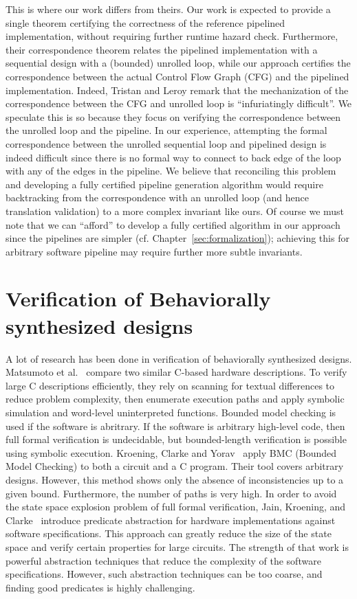 This is where our work differs from theirs.  Our work is
expected to provide a single theorem certifying the
correctness of the reference pipelined implementation,
without requiring further runtime hazard check.
Furthermore, their correspondence theorem relates the
pipelined implementation with a sequential design with a
(bounded) unrolled loop, while our approach certifies the
correspondence between the actual Control Flow Graph (CFG)
and the pipelined implementation.  Indeed, Tristan and Leroy
remark that the mechanization of the correspondence between
the CFG and unrolled loop is ``infuriatingly difficult''.
We speculate this is so because they focus on verifying the
correspondence between the unrolled loop and the pipeline.
In our experience, attempting the formal correspondence between the unrolled
sequential loop and pipelined design is indeed difficult since
there is no formal way to connect to back edge of the loop
with any of the edges in the pipeline.  We believe that
reconciling this problem and developing a fully certified
pipeline generation algorithm would require backtracking
from the correspondence with an unrolled loop (and hence
translation validation) to a more complex invariant like
ours.  Of course we must note that we can ``afford'' to
develop a fully certified algorithm in our approach since
the pipelines are simpler
(cf. Chapter~\ref{sec:formalization}); achieving this for
arbitrary software pipeline may require further more subtle
invariants.

\section{Verification of Behaviorally synthesized designs}

A lot of research has been done in verification of behaviorally synthesized designs. Matsumoto et al.~\cite{Matsumoto} compare two similar C-based hardware descriptions. 
To verify large C descriptions efficiently, they rely on scanning for textual differences 
to reduce problem complexity, then enumerate execution paths and 
apply symbolic simulation and word-level uninterpreted functions. 
Bounded model checking is used if the software is abritrary. 
If the software is arbitrary high-level code, then full formal verification
is undecidable, but bounded-length verification is possible using symbolic execution.
Kroening, Clarke and Yorav~\cite{Kroening1} apply BMC (Bounded Model
Checking) to both a circuit and a C program. Their tool covers arbitrary designs. However,
this method shows only the absence of inconsistencies up to a given bound.
Furthermore, the number of paths is very high. 
In order to avoid the state space explosion problem of full formal verification,
Jain, Kroening, and Clarke~\cite{Clarke:2005} introduce 
predicate abstraction for hardware implementations
against software specifications. This approach can greatly reduce the
size of the state space and verify certain properties for large circuits. The strength
of that work is powerful abstraction techniques that reduce the complexity of the
software specifications. However, such abstraction techniques can be too coarse, and
finding good predicates is highly challenging. 

